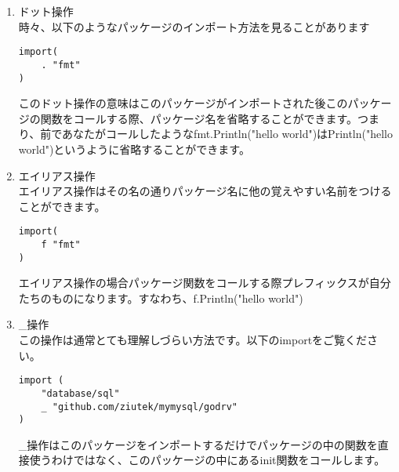 \begin{enumerate}
  \item ドット操作\\ 時々、以下のようなパッケージのインポート方法を見ることがあります
    \begin{lstlisting}[numbers=none]
import(
    . "fmt"
)
    \end{lstlisting}
 このドット操作の意味はこのパッケージがインポートされた後このパッケージの関数をコールする際、パッケージ名を省略することができます。つまり、前であなたがコールしたようなfmt.Println("hello world")はPrintln("hello world")というように省略することができます。
  \item エイリアス操作\\ エイリアス操作はその名の通りパッケージ名に他の覚えやすい名前をつけることができます。
    \begin{lstlisting}[numbers=none]
import(
    f "fmt"
)
    \end{lstlisting}
エイリアス操作の場合パッケージ関数をコールする際プレフィックスが自分たちのものになります。すなわち、f.Println("hello world")
  \item \_操作\\ この操作は通常とても理解しづらい方法です。以下のimportをご覧ください。
    \begin{lstlisting}[numbers=none]
import (
    "database/sql"
    _ "github.com/ziutek/mymysql/godrv"
)
    \end{lstlisting}
\_操作はこのパッケージをインポートするだけでパッケージの中の関数を直接使うわけではなく、このパッケージの中にあるinit関数をコールします。
\end{enumerate}



